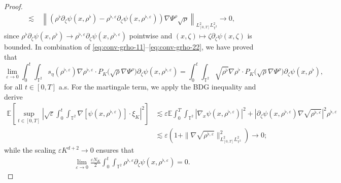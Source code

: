\begin{proof}
\begin{align}
\lesssim & \ \left\| \left(\rho^{\flat}\partial_\zeta\psi(x, \rho^{\flat})-\rho^{\flat,\varepsilon}\partial_\zeta\psi(x, \rho^{\flat,\varepsilon})\right) \nabla \Psi^{\rho} \sqrt{\rho} \right\|_{L^2_{[0,T]}L^2_{\mathbb{T}^2}} \to 0, 
\end{align}
since $\rho^{\flat}\partial_\zeta\psi(x, \rho^{\flat}) \to \rho^{\flat,\varepsilon}\partial_\zeta\psi(x, \rho^{\flat,\varepsilon})$ pointwise and $(x, \zeta) \mapsto \zeta \partial_\zeta\psi(x, \zeta)$ is bounded. In combination of \eqref{eq:conv-grho-11}--\eqref{eq:conv-grho-22}, we have proved that
\begin{equation}\label{eq:conv-grho}
  \lim_{\varepsilon\rightarrow 0} \int_{0}^{t} \int_{\mathbb{T}^2} s_{\eta}(\rho^{\flat,\varepsilon})\nabla\rho^{\flat,\varepsilon} \cdot P_{K}\big(\sqrt{\rho} \nabla \Psi^{\rho}\big)\partial_\zeta\psi(x, \rho^{\flat,\varepsilon}) = \int_{0}^{t} \int_{\mathbb{T}^2} \sqrt{\rho^{\flat}}\nabla\rho^{\flat} \cdot  P_{K} \big(\sqrt{\rho} \nabla \Psi^{\rho}\big)\partial_\zeta\psi(x, \rho^{\flat}),
\end{equation}
for all $t \in [0,T]$ a.s. For the martingale term, we apply the BDG inequality and derive
\begin{align}\label{MC M P}
\mathbb{E}\left[\sup_{t\in[0,T]}\left|\sqrt{\varepsilon}\int_0^t
\int_{\mathbb{T}^2}\nabla \left[\psi(x,\rho^{\flat,\varepsilon})\right] \cdot \xi_{K} \right|^2 \right] & \lesssim \varepsilon \mathbb{E} \int_0^T\int_{\mathbb{T}^2} |\nabla_x\psi(x,\rho^{\flat,\varepsilon})|^2 + \left|\partial_{\zeta}\psi(x,\rho^{\flat,\varepsilon})\nabla{\sqrt{\rho^{\flat,\varepsilon}}}\right|^2\rho^{\flat,\varepsilon}  \nonumber\\
& \lesssim \varepsilon \left(1 +  \|\nabla{\sqrt{\rho^{\flat,\varepsilon}}}\|^2_{L^2_{[0,T]}L^2_{\mathbb{T}^2}}\right) \to 0;
\end{align}
while the scaling $\varepsilon K^{d+2}\rightarrow 0$ ensures that \begin{align}\label{MC V P}
\lim_{\varepsilon\rightarrow 0}\frac{\varepsilon N_K}{2}\int_{0}^{t} \int_{\mathbb{T}^2} \rho^{\flat,\varepsilon} \partial_{\zeta} \psi(x, \rho^{\flat,\varepsilon}) = 0.
\end{align}
\end{proof}

